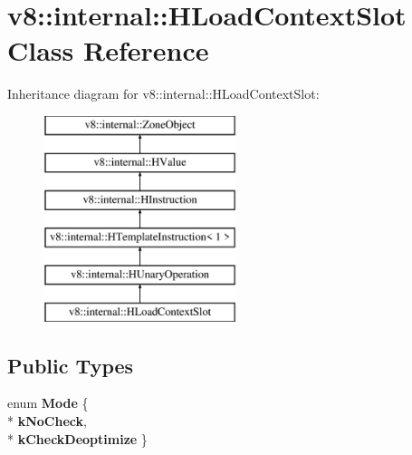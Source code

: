 \hypertarget{classv8_1_1internal_1_1_h_load_context_slot}{}\section{v8\+:\+:internal\+:\+:H\+Load\+Context\+Slot Class Reference}
\label{classv8_1_1internal_1_1_h_load_context_slot}
Inheritance diagram for v8\+:\+:internal\+:\+:H\+Load\+Context\+Slot\+:\begin{figure}[H]
\begin{center}
\leavevmode
\includegraphics[height=6.000000cm]{classv8_1_1internal_1_1_h_load_context_slot}
\end{center}
\end{figure}
\subsection*{Public Types}
\begin{DoxyCompactItemize}
\item 
enum {\bfseries Mode} \{ \\*
{\bfseries k\+No\+Check}, 
\\*
{\bfseries k\+Check\+Deoptimize}
 \}\hypertarget{classv8_1_1internal_1_1_h_load_context_slot_af93e0168526012c9747dec70beffa9fa}{}\label{classv8_1_1internal_1_1_h_load_context_slot_af93e0168526012c9747dec70beffa9fa}

\end{DoxyCompactItemize}

